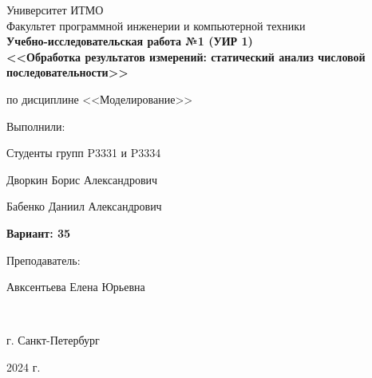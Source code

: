 \begin{center}
	\vspace{1cm}
	\large{Университет ИТМО}\\
	\large{Факультет программной инженерии и компьютерной техники}\\
	\vspace{4cm}
	\Large{\textbf{Учебно-исследовательская работа №1 (УИР 1)\\}}
	\vspace{0.3cm}
	\large{\textbf{<<Обработка результатов измерений: статический анализ числовой последовательности>>\\}}
	\vspace{-0.3cm}
	\begin{center}
		\large{по дисциплине <<Моделирование>>}
	\end{center}
	\vspace{3cm}
\end{center}
\normalsize{
	\begin{flushright}
		Выполнили:
		\par
		Студенты групп P3331 и P3334
		\par
		Дворкин Борис Александрович
		\par
		Бабенко Даниил Александрович
		\par
		\textbf{Вариант: 35}
		\par
		\vspace{1cm}
		Преподаватель:
		\par
		Авксентьева Елена Юрьевна
	\end{flushright}
}\\
\vspace{6cm}
\begin{center} г. Санкт-Петербург
	\par
	2024 г.
\end{center}
\thispagestyle{empty}
\thispagestyle{empty}
